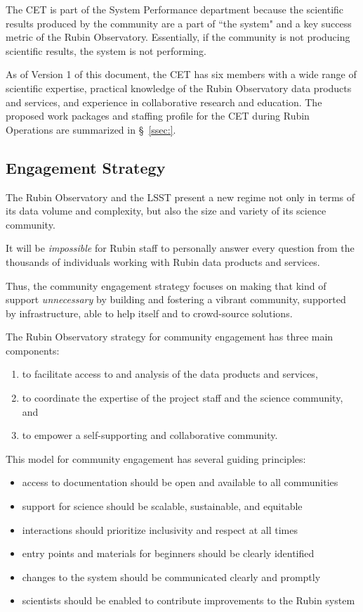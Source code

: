 \documentclass[DM,lsstdraft,toc]{lsstdoc}
\begin{document}
The CET is part of the System Performance department because the scientific results produced by the community are a part of ``the system" and a key success metric of the Rubin Observatory.
Essentially, if the community is not producing scientific results, the system is not performing. 

As of Version 1 of this document, the CET has six members with a wide range of scientific expertise, practical knowledge of the Rubin Observatory data products and services, and experience in collaborative research and education.
The proposed work packages and staffing profile for the CET during Rubin Operations are summarized in \S~\ref{ssec:}.


\subsection{Engagement Strategy}\label{ssec:intro_strat}

The Rubin Observatory and the LSST present a new regime not only in terms of its data volume and complexity, but also the size and variety of its science community.

It will be \textit{impossible} for Rubin staff to personally answer every question from the thousands of individuals working with Rubin data products and services.

Thus, the community engagement strategy focuses on making that kind of support \textit{unnecessary} by building and fostering a vibrant community, supported by infrastructure, able to help itself and to crowd-source solutions. 

The Rubin Observatory strategy for community engagement has three main components:
\begin{enumerate}
\item to facilitate access to and analysis of the data products and services,
\item to coordinate the expertise of the project staff and the science community, and
\item to empower a self-supporting and collaborative community.
\end{enumerate}

This model for community engagement has several guiding principles:
\begin{itemize}
\item access to documentation should be open and available to all communities
\item support for science should be scalable, sustainable, and equitable
\item interactions should prioritize inclusivity and respect at all times
\item entry points and materials for beginners should be clearly identified
\item changes to the system should be communicated clearly and promptly
\item scientists should be enabled to contribute improvements to the Rubin system
\end{itemize}
\end{document}
